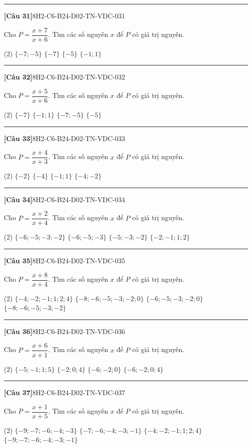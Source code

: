 \documentclass[12pt,a4paper]{article}
\newif\ifloigiai
\newenvironment{cauhoi}[2]{%
  \par\medskip\noindent\rule{\textwidth}{0.4pt}\par\nopagebreak
  \noindent\textbf{[#1]}\hfill{\scriptsize\ttfamily #2}\par\nopagebreak\smallskip}{\par}
\newcommand{\dapan}[1]{\ifloigiai\par\smallskip\noindent\textit{Đáp án:} \textbf{#1}\par\fi}
\begin{document}
\begin{cauhoi}{Câu 31}{8H2-C6-B24-D02-TN-VDC-031}
Cho $P=\dfrac{x+7}{x+6}$. Tìm các số nguyên $x$ để $P$ có giá trị nguyên.
\begin{tasks}(2)
\task $\{-7; -5\}$
\task $\{-7\}$
\task $\{-5\}$
\task $\{-1; 1\}$
\end{tasks}
\dapan{A}
\end{cauhoi}
\begin{cauhoi}{Câu 32}{8H2-C6-B24-D02-TN-VDC-032}
Cho $P=\dfrac{x+5}{x+6}$. Tìm các số nguyên $x$ để $P$ có giá trị nguyên.
\begin{tasks}(2)
\task $\{-7\}$
\task $\{-1; 1\}$
\task $\{-7; -5\}$
\task $\{-5\}$
\end{tasks}
\dapan{C}
\end{cauhoi}
\begin{cauhoi}{Câu 33}{8H2-C6-B24-D02-TN-VDC-033}
Cho $P=\dfrac{x+4}{x+3}$. Tìm các số nguyên $x$ để $P$ có giá trị nguyên.
\begin{tasks}(2)
\task $\{-2\}$
\task $\{-4\}$
\task $\{-1; 1\}$
\task $\{-4; -2\}$
\end{tasks}
\dapan{D}
\end{cauhoi}
\begin{cauhoi}{Câu 34}{8H2-C6-B24-D02-TN-VDC-034}
Cho $P=\dfrac{x+2}{x+4}$. Tìm các số nguyên $x$ để $P$ có giá trị nguyên.
\begin{tasks}(2)
\task $\{-6; -5; -3; -2\}$
\task $\{-6; -5; -3\}$
\task $\{-5; -3; -2\}$
\task $\{-2; -1; 1; 2\}$
\end{tasks}
\dapan{A}
\end{cauhoi}
\begin{cauhoi}{Câu 35}{8H2-C6-B24-D02-TN-VDC-035}
Cho $P=\dfrac{x+8}{x+4}$. Tìm các số nguyên $x$ để $P$ có giá trị nguyên.
\begin{tasks}(2)
\task $\{-4; -2; -1; 1; 2; 4\}$
\task $\{-8; -6; -5; -3; -2; 0\}$
\task $\{-6; -5; -3; -2; 0\}$
\task $\{-8; -6; -5; -3; -2\}$
\end{tasks}
\dapan{B}
\end{cauhoi}
\begin{cauhoi}{Câu 36}{8H2-C6-B24-D02-TN-VDC-036}
Cho $P=\dfrac{x+6}{x+1}$. Tìm các số nguyên $x$ để $P$ có giá trị nguyên.
\begin{tasks}(2)
\task $\{-5; -1; 1; 5\}$
\task $\{-2; 0; 4\}$
\task $\{-6; -2; 0\}$
\task $\{-6; -2; 0; 4\}$
\end{tasks}
\dapan{D}
\end{cauhoi}
\begin{cauhoi}{Câu 37}{8H2-C6-B24-D02-TN-VDC-037}
Cho $P=\dfrac{x+1}{x+5}$. Tìm các số nguyên $x$ để $P$ có giá trị nguyên.
\begin{tasks}(2)
\task $\{-9; -7; -6; -4; -3\}$
\task $\{-7; -6; -4; -3; -1\}$
\task $\{-4; -2; -1; 1; 2; 4\}$
\task $\{-9; -7; -6; -4; -3; -1\}$
\end{tasks}
\dapan{D}
\end{cauhoi}
\end{document}
